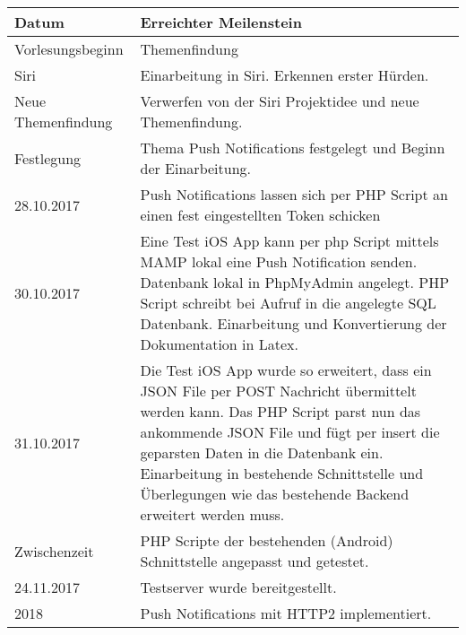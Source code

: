 \noindent%
\begin{tabularx}{\textwidth}{|p{}|X| }
\hline
\textbf{Datum} & \textbf{Erreichter Meilenstein}  \\ \hline 

Vorlesungsbeginn & Themenfindung \\ \hline

Siri & Einarbeitung in Siri. Erkennen erster Hürden. \\ \hline

Neue Themenfindung & Verwerfen von der Siri Projektidee und neue Themenfindung. \\ \hline

Festlegung & Thema Push Notifications festgelegt und Beginn der Einarbeitung. \\ \hline

28.10.2017 & Push Notifications lassen sich per PHP Script an einen fest eingestellten Token schicken \\ \hline

30.10.2017 & Eine Test iOS App kann per php Script mittels MAMP lokal eine Push Notification senden. \newline
Datenbank lokal in PhpMyAdmin angelegt. \newline
PHP Script schreibt bei Aufruf in die angelegte SQL Datenbank. \newline
Einarbeitung und Konvertierung der Dokumentation in Latex.
 \\ \hline
 31.10.2017 & Die Test iOS App wurde so erweitert, dass ein JSON File per POST Nachricht übermittelt werden kann.\newline
Das PHP Script parst nun das ankommende JSON File und fügt per insert die geparsten Daten in die Datenbank ein.\newline 
Einarbeitung in bestehende Schnittstelle und Überlegungen wie das bestehende Backend erweitert werden muss. 
 \\ \hline
 

Zwischenzeit & PHP Scripte der bestehenden (Android) Schnittstelle angepasst und getestet. \newline
\\ \hline 
 
 
24.11.2017 & Testserver wurde bereitgestellt. \newline
\\ \hline 
 
 
2018 & Push Notifications mit HTTP2 implementiert.
\newline
\\ \hline  

\end{tabularx}

